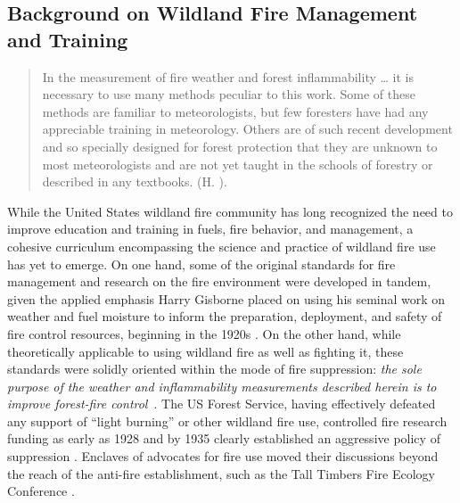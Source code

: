 \documentclass[fire,casereport,accept,moreauthors,pdftex]{Definitions/mdpi}  %
\begin{document}
\subsection{Background on Wildland Fire Management and Training}
\begin{quote}
{In the measuremen}t of fire weather and forest inflammability \ldots{} it is necessary to use many methods peculiar to this work.
Some of these methods are familiar to meteorologists, but few foresters have had any appreciable training in meteorology.
Others are of such recent development and so specially designed for forest protection that they are unknown to most meteorologists and are not yet taught in the schools of forestry or described in any textbooks. (H. \citet[][p.~1]{gisborne1936}).
\end{quote} %

While the United States wildland fire community has long recognized the need to improve education and training in fuels, fire behavior, and management, a cohesive curriculum encompassing the science and practice of wildland fire use has yet to emerge.
On one hand, some of the original standards for fire management and research on the fire environment were developed in tandem, given the applied emphasis Harry Gisborne placed on using his seminal work on weather and fuel moisture to inform the preparation, deployment, and safety of fire control resources, beginning in the 1920s \citep{hardy1983}.
On the other hand, while theoretically applicable to using wildland fire as well as fighting it, these standards were solidly oriented within the mode of fire suppression: \emph{the sole purpose of the weather and inflammability measurements described herein is to improve forest-fire control}~\citep{gisborne1936}.
The US Forest Service, having effectively defeated any support of ``light burning'' or other wildland fire use, controlled fire research funding as early as 1928 and by 1935 clearly established an aggressive policy of suppression \citep{pyne2015}.
Enclaves of advocates for fire use moved their discussions beyond the reach of the anti-fire establishment, such as the Tall Timbers Fire Ecology Conference \citep{pyne2015}.

\end{document}
